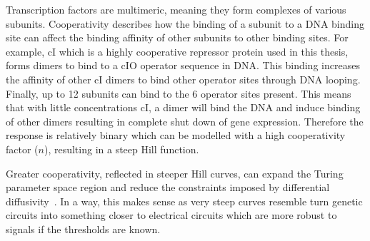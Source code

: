 Transcription factors are multimeric, meaning they form complexes of various subunits.
Cooperativity describes how the binding of a subunit to a DNA binding site can affect the binding affinity of other subunits to other binding sites.
For example, cI which is a highly cooperative repressor protein used in this thesis, forms dimers to bind to a cIO operator sequence in DNA.
This binding increases the affinity of other cI dimers to bind other operator sites through DNA looping.
Finally, up to 12 subunits can bind to the 6 operator sites present.
This means that with little concentrations cI, a dimer will bind the DNA and induce binding of other dimers resulting in complete shut down of gene expression.
Therefore the response is relatively binary which can be modelled with a high cooperativity factor ($n$), resulting in a steep Hill function.


Greater cooperativity, reflected in steeper Hill curves, can expand the Turing parameter space region and reduce the constraints imposed by differential diffusivity~\parencite{Diambra2015a}.
In a way, this makes sense as very steep curves resemble turn genetic circuits into something closer to electrical circuits which are more robust to signals if the thresholds are known.
%
%



